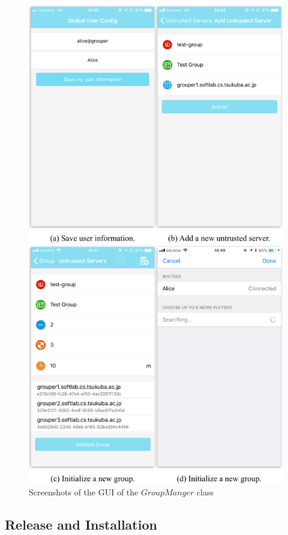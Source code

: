 \documentclass[a4paper,11pt]{report}
\begin{document}
\begin{figure}[H]
	\centering
	\includegraphics[scale=0.7]{group_manager_screenshot}
	\caption{Screenshots of the GUI of the $GroupManger$ class}
	\label{fig:group_manager_screenshot}
\end{figure}

\subsection{Release and Installation}
\end{document}
